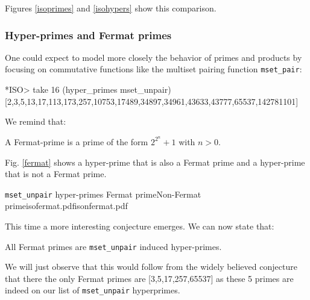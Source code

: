 \documentclass[]{INCLUDES/llncs}
\begin{document}
Figures %
\ref{isoprimes} and \ref{isohypers} show this
comparison.


\clearpage

\subsubsection{Hyper-primes and Fermat primes}
One could expect to model more closely the behavior of primes and products by
focusing on commutative functions like the multiset pairing function
{\tt mset\_pair}:
\begin{codex}
*ISO> take 16 (hyper_primes mset_unpair)
[2,3,5,13,17,113,173,257,10753,17489,34897,34961,43633,43777,65537,142781101]
\end{codex}
We remind that:
\begin{df}
A Fermat-prime is a prime of the form $2^{2^n}+1$ with $n>0$.
\end{df}
Fig. \ref{fermat} shows a hyper-prime that is also a Fermat prime
and a hyper-prime that is not a Fermat prime.

{{\tt mset\_unpair} hyper-primes}
{Fermat prime}{Non-Fermat prime}{isofermat.pdf}{isonfermat.pdf}


This time a more interesting conjecture emerges.
We can now state that:
\begin{conj}
All Fermat primes are {\tt mset\_unpair} induced hyper-primes.
\end{conj}
We will just observe that this would follow from
the widely believed conjecture that there the only Fermat primes are
[3,5,17,257,65537] as these 5 primes are indeed on our list of
{\tt mset\_unpair} hyperprimes.
\end{document}
